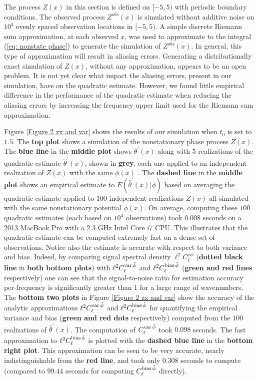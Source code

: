 \documentclass[10pt,noinfoline]{imsart}
\begin{document}
The process $Z(x)$ in this section is defined on $[-5,5)$ with periodic boundary conditions. 
The observed process $Z^{obs}(x)$ is simulated without additive noise on $10^4$ evenly spaced observation locations in $[-5,5)$.  A simple discrete Riemann sum approximation, at each observed $x$, was used to approximate to the integral (\ref{eq: nonstate phase}) to generate the simulation of $Z^{obs}(x)$. In general, this type of approximation will result in aliasing errors. Generating a distributionally exact simulation of $Z(x)$, without any approximation, appears to be an open problem.   It is not yet clear what impact the aliasing errors, present in our simulation, have on the quadratic estimate. However, we found little empirical difference in the performance of the quadratic estimate when reducing the aliasing errors by increasing the frequency upper limit used for the Riemann sum approximation. 





Figure \ref{Figure 2 zx and var} shows the results of our simulation when $t_0$ is set to $1.5$. The \textbf{top plot} shows a simulation of the nonstationary phase process $Z(x)$. The \textbf{blue line} in the \textbf{middle plot} shows $\theta^\prime(x)$ along with $5$ realizations of the quadratic estimate $\hat\theta^\prime(x)$, shown in \textbf{grey}, each one applied to an independent realization of $Z(x)$ with the same $\phi(x)$ . The \textbf{dashed line} in the \textbf{middle plot} shows an empirical estimate to $E(\hat\theta^\prime(x)|\phi)$ based on averaging the quadratic estimate applied to $100$ independent realizations $Z(x)$ all simulated with the same nonstationary potential $\phi(x)$. On average, computing these $100$ quadratic estimates (each based on $10^4$ observations) took $0.008$ seconds on a 2013 MacBook Pro with a 2.3 GHz Intel Core i7 CPU. This illustrates that the quadratic estimate can be computed extremely fast on a dense set of observations. Notice also the estimate is accurate with respect to both variance and bias. Indeed, by comparing signal spectral density $\ell^2 C_\ell^{\phi\phi}$ (\textbf{dotted black line} in \textbf{both bottom plots})  with  $\ell^2 C^{\text{var\,}\hat\phi}_{\ell}$ and $\ell^2 C^{\text{bias\,}\hat\phi}_{\ell}$  (\textbf{green and red lines} respectively) one can see that the signal-to-noise ratio for estimation accuracy per-frequency is significantly greater than $1$ for a large range of wavenumbers. The \textbf{bottom two plots} in Figure \ref{Figure 2 zx and var} show the accuracy of the analytic approximations $\ell^2 C^{\text{var\,}\hat\phi}_{\ell}$ and  $\ell^2 C^{\text{bias\,}\hat\phi}_{\ell}$ for quantifying the empirical variance and bias (\textbf{green and red dots} respectively) computed from the $100$ realizations of $\hat\theta^\prime(x)$. The computation of $C^{\text{var\,}\hat\phi}_{\ell}$ took $0.098$ seconds. The fast approximation to  $\ell^2 C^{\text{bias\,}\hat\phi}_{\ell}$ is plotted with the \textbf{dashed blue line} in the \textbf{bottom right plot}. This approximation can be seen to be very accurate, nearly indistinguishable from the \textbf{red line}, and took only $0.308$ seconds to compute (compared to $99.44$ seconds for computing  $C^{\text{bias\,}\hat\phi}_{\ell}$ directly).
\end{document}
